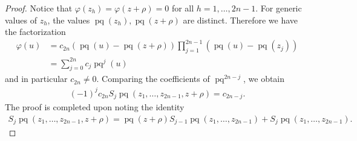 \documentclass{amsart}
\theoremstyle{definition}
\DeclareMathOperator{\pq}{pq}
\begin{document}
\begin{proof}
    Notice that $\varphi(z_h)=\varphi(z+\rho)=0$ for all $h=1,\ldots,2n-1$. For generic values of $z_h$, the values $\pq(z_h),\pq(z+\rho)$ are distinct. Therefore we have the factorization
    \begin{align*}
        \varphi(u)&=c_{2n}\left(\pq(u)- \pq(z+\rho) \right)\prod_{j=1}^{2n-1}\left(\pq(u)- \pq(z_j)\right)\\
&=\sum_{j=0}^{2n}c_j\pq^{j}(u)
    \end{align*}
    and in particular $c_{2n}\neq 0$. Comparing the coefficients of $\pq^{2n-j}$, we obtain
    \begin{align*}
        (-1)^j c_{2n}S_j\pq(z_1,\ldots,z_{2n-1},z+\rho)=c_{2n-j}.
    \end{align*}
    The proof is completed upon noting the identity
    \begin{align*}
        S_j\pq(z_1,\ldots,z_{2n-1},z+\rho)=\pq(z+\rho)S_{j-1}\pq(z_1,\ldots,z_{2n-1})+S_{j}\pq(z_1,\ldots,z_{2n-1}).
    \end{align*}
\end{proof}
\end{document}
